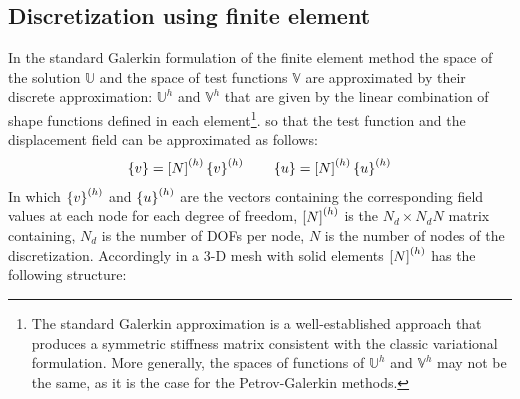 \subsection{Discretization using finite element}\label{subsec1.1.2}
In the standard Galerkin formulation of the finite element method the space of the solution $\mathbb{U}$ and the space of test functions $\mathbb{V}$ are approximated by their discrete approximation: $\mathbb{U}^h$ and $\mathbb{V}^h$ that are given by the linear combination of shape functions defined in each element\footnote{The standard Galerkin approximation is a well-established approach that produces a symmetric stiffness matrix consistent with the classic variational formulation. More generally, the spaces of functions of $\mathbb{U}^h$ and $\mathbb{V}^h$ may not be the same, as it is the case for the Petrov-Galerkin methods. }. so that the test function and the displacement field can be approximated as follows:
\begin{eqnarray}
\label{eq.1.11}
\left\lbrace{v}\right \rbrace=\left[{N}\right]^{(h)}\left\lbrace{v}\right \rbrace^{(h)} \qquad
\left\lbrace{u}\right \rbrace=\left[{N}\right]^{(h)}\left\lbrace{u}\right \rbrace^{(h)}
\end{eqnarray}
In which $\left\lbrace{v}\right \rbrace^{(h)}$ and $\left\lbrace{u}\right \rbrace^{(h)}$ are the vectors containing the corresponding field values at each node for each degree of freedom, $\left[{N}\right]^{(h)}$ is the $N_d \times N_dN$ matrix containing, $N_d$ is the number of DOFs per node, $N$ is the number of nodes of the discretization. Accordingly in a 3-D mesh with solid elements  $\left[{N}\right]^{(h)}$ has the following structure:

